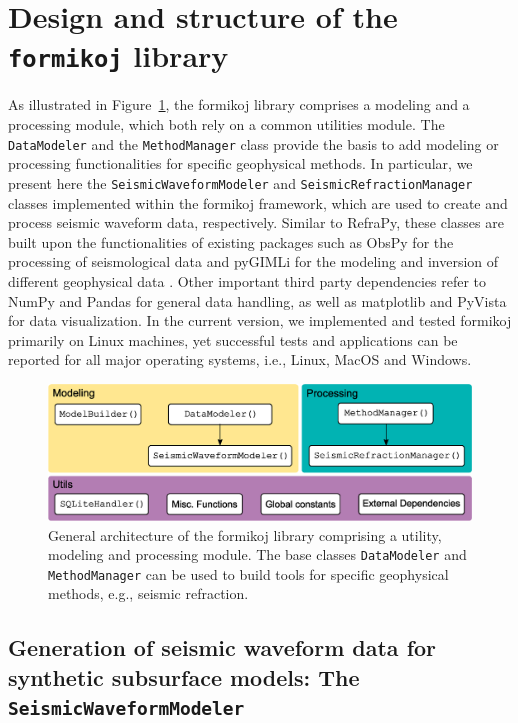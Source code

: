 \documentclass[a4paper,fleqn]{cas-sc}
\begin{document}
\section{Design and structure of the \texttt{formikoj} library}

As illustrated in Figure~\ref{fig:scheme}, the formikoj library comprises a modeling and a processing module, which both rely on a common utilities module. The \texttt{DataModeler} and the \texttt{MethodManager} class provide the basis to add modeling or processing functionalities for specific geophysical methods. In particular, we present here the \texttt{SeismicWaveformModeler} and \texttt{SeismicRefractionManager} classes implemented within the formikoj framework, which are used to create and process seismic waveform data, respectively. Similar to RefraPy, these classes are built upon the functionalities of existing packages such as ObsPy for the processing of seismological data \citep[][]{beyreuther2010} and pyGIMLi for the modeling and inversion of different geophysical data \citep{ruecker2017}. Other important third party dependencies refer to NumPy \citep{harris2020} and Pandas \citep{mckinney2010} for general data handling, as well as matplotlib \citep{hunter2007} and PyVista \citep{sullivan2019} for data visualization. In the current version, we implemented and tested formikoj primarily on Linux machines, yet successful tests and applications can be reported for all major operating systems, i.e., Linux, MacOS and Windows.

\begin{figure}
	\centering
	\includegraphics[width=.75\textwidth]{figures/package_structure}
	\caption{General architecture of the formikoj library comprising a utility, modeling and processing module. The base classes \texttt{DataModeler} and \texttt{MethodManager} can be used to build tools for specific geophysical methods, e.g., seismic refraction.}
	\label{fig:scheme}
\end{figure}

\subsection{Generation of seismic waveform data for synthetic subsurface models: The \texttt{SeismicWaveformModeler}}
\end{document}
